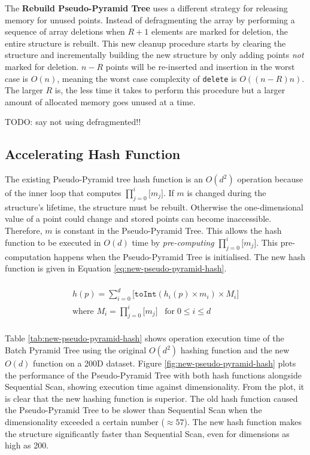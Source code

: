 The \textbf{Rebuild Pseudo-Pyramid Tree} uses a different strategy for releasing memory for unused points. Instead of defragmenting the array by performing a sequence of array deletions when $R + 1$ elements are marked for deletion, the entire structure is rebuilt. This new cleanup procedure starts by clearing the structure and incrementally building the new structure by only adding points \textit{not} marked for deletion. $n - R$ points will be re-inserted and insertion in the worst case is $O(n)$, meaning the worst case complexity of \texttt{delete} is $O((n - R)n)$. The larger $R$ is, the less time it takes to perform this procedure but a larger amount of allocated memory goes unused at a time.

TODO: say not using defragmented!!

\subsection{Accelerating Hash Function}

The existing Pseudo-Pyramid tree hash function is an $O(d^2)$ operation because of the inner loop that computes $\prod_{j=0}^{i}{\lbrack m_j \rbrack}$. If $m$ is changed during the structure's lifetime, the structure must be rebuilt. Otherwise the one-dimensional value of a point could change and stored points can become inaccessible. Therefore, $m$ is constant in the Pseudo-Pyramid Tree. This allows the hash function to be executed in $O(d)$ time by \textit{pre-computing} $\prod_{j=0}^{i}{\lbrack m_j \rbrack}$. This pre-computation happens when the Pseudo-Pyramid Tree is initialised. The new hash function is given in Equation \ref{eq:new-pseudo-pyramid-hash}.

\begin{multline}\\
	h(p) = \sum_{i = 0}^{d} { \lbrack \texttt{toInt}( h_i(p) \times m_i ) \times M_i \rbrack } \\
	\text{where } M_i = \prod_{j=0}^{i}{\lbrack m_j \rbrack} \;\;\; \text{for} \; 0 \leq i \leq d \\
	\label{eq:new-pseudo-pyramid-hash}
\end{multline}

Table \ref{tab:new-pseudo-pyramid-hash} shows operation execution time of the Batch Pyramid Tree using the original $O(d^2)$ hashing function and the new $O(d)$ function on a 200D dataset. Figure \ref{fig:new-pseudo-pyramid-hash} plots the performance of the Pseudo-Pyramid Tree with both hash functions alongside Sequential Scan, showing execution time against dimensionality. From the plot, it is clear that the new hashing function is superior. The old hash function caused the Pseudo-Pyramid Tree to be slower than Sequential Scan when the dimensionality exceeded a certain number ($\approx 57$). The new hash function makes the structure significantly faster than Sequential Scan, even for dimensions as high as 200.

